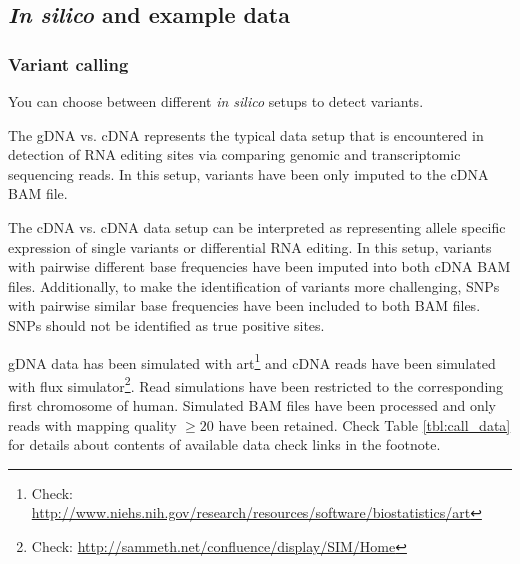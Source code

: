 \documentclass[10pt,a4paper,final]{article}
\begin{document}
\subsection{\textit{In silico} and example data}
\subsubsection{Variant calling}
You can choose between different \textit{in silico} setups to detect variants. 

The gDNA vs. cDNA represents the typical data setup that is encountered in detection of RNA editing
sites via comparing genomic and transcriptomic sequencing reads. In this setup, variants have been
only imputed to the cDNA BAM file.

The cDNA vs. cDNA data setup can be interpreted as representing allele specific expression of single
variants or differential RNA editing. In this setup, variants with pairwise different base
frequencies have been imputed into both cDNA BAM files. Additionally, to make the identification of
variants more challenging, SNPs with pairwise similar base frequencies have been included to both
BAM files. SNPs should not be identified as true positive sites.

gDNA data has been simulated with art\footnote{Check: 
\url{http://www.niehs.nih.gov/research/resources/software/biostatistics/art}} and cDNA reads
have been simulated with flux simulator\footnote{Check: \url{http://sammeth.net/confluence/display/SIM/Home}}.
Read simulations have been restricted to the corresponding first chromosome of human. Simulated BAM
files have been processed and only reads with mapping quality $\ge 20$ have been retained. Check
Table \ref{tbl:call_data} for details about contents of available data check links in the footnote.
\end{document}
